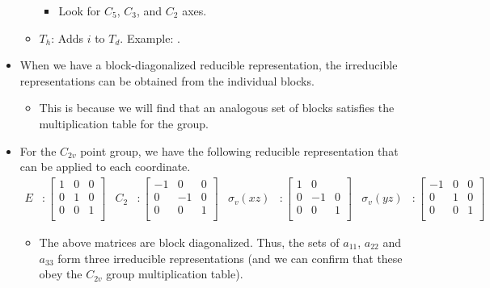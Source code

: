 \documentclass[../notes.tex]{subfiles}
\begin{document}
\begin{itemize}
\begin{itemize}
\begin{itemize}
            \item Look for $C_5$, $C_3$, and $C_2$ axes.
        \end{itemize}
        \item $T_h$: Adds $i$ to $T_d$. Example: .
    \end{itemize}
    \item {}When we have a block-diagonalized reducible representation, the irreducible representations can be obtained from the individual blocks.
    \begin{itemize}
        \item This is because we will find that an analogous set of blocks satisfies the multiplication table for the group.
    \end{itemize}
    \item For the $C_{2v}$ point group, we have the following reducible representation that can be applied to each coordinate.
    \begin{align*}
        E &:
        \begin{bmatrix}
            1 & 0 & 0\\
            0 & 1 & 0\\
            0 & 0 & 1\\
        \end{bmatrix}&
        C_2 &:
        \begin{bmatrix}
            -1 & 0 & 0\\
            0 & -1 & 0\\
            0 & 0 & 1\\
        \end{bmatrix}&
        \sigma_v(xz) &:
        \begin{bmatrix}
            1 & 0 & \\
            0 & -1 & 0\\
            0 & 0 & 1\\
        \end{bmatrix}&
        \sigma_v(yz) &:
        \begin{bmatrix}
            -1 & 0 & 0\\
            0 & 1 & 0\\
            0 & 0 & 1\\
        \end{bmatrix}
    \end{align*}
    \begin{itemize}
        \item The above matrices are block diagonalized. Thus, the sets of $a_{11}$, $a_{22}$ and $a_{33}$ form three irreducible representations (and we can confirm that these obey the $C_{2v}$ group multiplication table).

\end{itemize}
\end{itemize}
\end{document}
